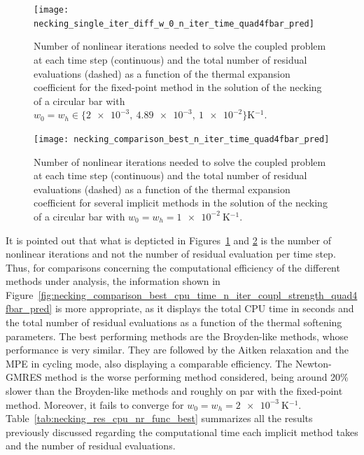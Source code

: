      \begin{figure}[htbp]
       \centering
       \texttt{[image: necking\_single\_iter\_diff\_w\_0\_n\_iter\_time\_quad4fbar\_pred]}
       \caption{Number of nonlinear iterations needed to solve the coupled problem at each time step (continuous) and the total number of residual evaluations (dashed) as a function of the thermal expansion coefficient for the fixed-point method in the solution of the necking of a circular bar with \(w_0=w_h\in\{\num{2e-3},\ \num{4.89e-3},\ \num{1e-2}\}\si{\kelvin^{-1}}\).}
       \label{fig:necking_single_iter_diff_w_0_n_iter_time_quad4fbar_pred}
     \end{figure}

     \begin{figure}[!hbtp]
       \centering
       \texttt{[image: necking\_comparison\_best\_n\_iter\_time\_quad4fbar\_pred]}
       \caption{Number of nonlinear iterations needed to solve the coupled problem at each time step (continuous) and the total number of residual evaluations (dashed) as a function of the thermal expansion coefficient for several implicit methods in the solution of the necking of a circular bar with \(w_0=w_h=\SI{1e-2}{\kelvin^{-1}}\).}
       \label{fig:necking_comparison_best_n_iter_time_quad4fbar_pred}
     \end{figure}


     It is pointed out that what is depticted in Figures~\ref{fig:necking_single_iter_diff_w_0_n_iter_time_quad4fbar_pred} and \ref{fig:necking_comparison_best_n_iter_time_quad4fbar_pred} is the number of nonlinear iterations and not the number of residual evaluation per time step.
     Thus, for comparisons concerning the computational efficiency of the different methods under analysis, the information shown in
     Figure~\ref{fig:necking_comparison_best_cpu_time_n_iter_coupl_strength_quad4fbar_pred} is more appropriate, as it displays the total CPU time in seconds and the total number of residual evaluations as a function of the thermal softening parameters.
     The best performing methods are the Broyden-like methods, whose performance is very similar.
     They are followed by the Aitken relaxation and the MPE in cycling mode, also displaying a comparable efficiency.
     The Newton-GMRES method is the worse performing method considered, being around 20\% slower than the Broyden-like methods and roughly on par with the fixed-point method.
     Moreover, it fails to converge for \(w_0=w_h=\SI{2e-3}{\kelvin^{-1}}\).
     Table~\ref{tab:necking_res_cpu_nr_func_best} summarizes all the results previously discussed regarding the computational time each implicit method takes and the number of residual evaluations.

